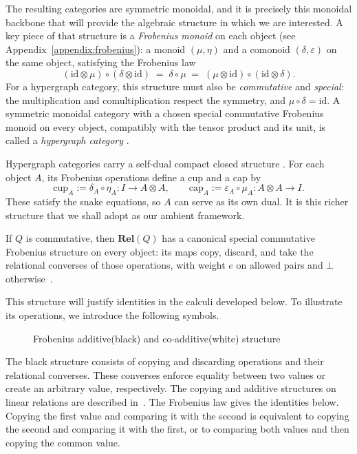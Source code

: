 The resulting categories are symmetric monoidal, and it is precisely this
monoidal backbone that will provide the algebraic structure in which we
are interested. A key piece of
that structure is a \emph{Frobenius monoid} on each object 
(see Appendix~\ref{appendix:frobenius}): a monoid $(\mu, \eta)$ 
and a comonoid $(\delta, \varepsilon)$ on the same object, satisfying the Frobenius law
\[
	(\mathrm{id} \otimes \mu) \circ (\delta \otimes \mathrm{id})
	\;=\;
	\delta \circ \mu
	\;=\;
	(\mu \otimes \mathrm{id}) \circ (\mathrm{id} \otimes \delta).
\]
For a hypergraph category, this structure must also be \emph{commutative}
and \emph{special}: the multiplication and comultiplication respect the symmetry,
and $\mu\circ\delta=\mathrm{id}$. A symmetric monoidal category with a chosen
special commutative Frobenius monoid on every object, compatibly with the tensor
product and its unit, is called a \emph{hypergraph category}
\cite[Definition~2.12]{fong2019hypergraph}.

Hypergraph categories carry a self-dual compact closed structure
\cite[Proposition~3.1]{fong2019hypergraph}. For each object $A$, its Frobenius
operations define a cup and a cap by
\[
	\mathrm{cup}_A := \delta_A\circ\eta_A : I\to A\otimes A,
	\qquad
	\mathrm{cap}_A := \varepsilon_A\circ\mu_A : A\otimes A\to I.
\]
These satisfy the snake equations, so $A$ can serve as its own dual.
It is this richer structure that we shall adopt as our ambient framework.

\begin{remark}
	If $Q$ is commutative, then $\mathbf{Rel}(Q)$ has a canonical special
commutative Frobenius structure on every object: its maps copy, discard,
and take the relational converses of those operations, with weight $e$ on
allowed pairs and $\bot$ otherwise~\cite{coecke2018generalizedrelations}.
\end{remark}

This structure will justify identities in the calculi developed below.
To illustrate its operations, we introduce the following symbols.

\begin{figure}[H]
    \centering
    
    \caption{Frobenius additive(black) and co-additive(white) structure}
\end{figure}

The black structure consists of copying and discarding operations and their
relational converses. These converses enforce equality between two values or
create an arbitrary value, respectively. The copying and additive structures
on linear relations are described in~\cite[Examples~2.10--2.11]{fong2019hypergraph}.
The Frobenius law gives the identities below. Copying the first value and
comparing it with the second is equivalent to copying the second and comparing
it with the first, or to comparing both values and then copying the common value.


